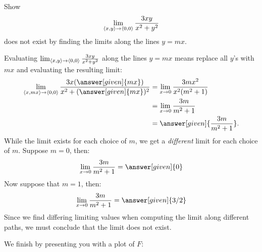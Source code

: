 \documentclass{ximera}
\begin{document}
\begin{example}
  Show
  \[
  \lim_{\left\langle x,y\right\rangle\to\left\langle 0,0\right\rangle} \frac{3xy}{x^2+y^2}
  \]
  does not exist by finding the limits along the lines $y=mx$.
  \begin{explanation}
    Evaluating $\lim_{\left\langle x,y\right\rangle\to\left\langle 0,0\right\rangle} \frac{3xy}{x^2+y^2}$ along
    the lines $y=mx$ means replace all $y$'s with $mx$ and evaluating
    the resulting limit:
    \begin{align*}
      \lim_{\vector{x,mx}\to\vector{0,0}} \frac{3x(\answer[given]{m x})}{x^2+(\answer[given]{mx})^2} &=\lim_{x\to0} \frac{3mx^2}{x^2(m^2+1)}\\
      &= \lim_{x\to 0}\frac{3m}{m^2+1}\\
      &= \answer[given]{\frac{3m}{m^2+1}}.
    \end{align*}
    While the limit exists for each choice of $m$, we get a
    \textit{different} limit for each choice of $m$. Suppose $m=0$,
    then:
    \[
    \lim_{x\to 0}\frac{3m}{m^2+1} = \answer[given]{0}
    \]
    Now suppose that $m=1$, then:
    \[
    \lim_{x\to 0}\frac{3m}{m^2+1} = \answer[given]{3/2}
    \]
    Since we find differing limiting values when computing the limit
    along different paths, we must conclude that the limit does not
    exist.
    \begin{onlineOnly}
      We finish by presenting you with a plot of $F$:
      \begin{center}
      \end{center}
    \end{onlineOnly}
  \end{explanation}
\end{example}
\end{document}
